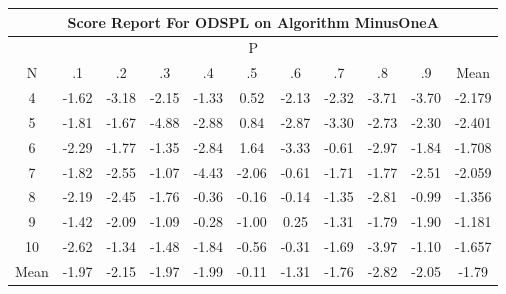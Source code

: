 \documentclass[11pt,a4paper]{report}
\begin{document}
\begin{longtable}{ | c || c | c | c | c | c | c | c | c | c || c |}
\hline
\multicolumn{11}{|c|}{ Score Report For ODSPL on Algorithm MinusOneA} \\
\hline
\multicolumn{11}{|c|}{ P } \\
\hline
N & .1 & .2 & .3 & .4 & .5 & .6 & .7 & .8 & .9 & Mean\\
 \hline
 \hline
 \endhead
  4 &  \cellcolor[HTML]{FFD7D7} -1.62 &  \cellcolor[HTML]{FFAFAF} -3.18 &  \cellcolor[HTML]{FFC7C7} -2.15 &  \cellcolor[HTML]{FFDFDF} -1.33 &  \cellcolor[HTML]{EFEFFF} 0.52 &  \cellcolor[HTML]{FFC7C7} -2.13 &  \cellcolor[HTML]{FFC7C7} -2.32 &  \cellcolor[HTML]{FF9F9F} -3.71 &  \cellcolor[HTML]{FF9F9F} -3.70 & -2.179 \\
  5 &  \cellcolor[HTML]{FFCFCF} -1.81 &  \cellcolor[HTML]{FFD7D7} -1.67 &  \cellcolor[HTML]{FF8787} -4.88 &  \cellcolor[HTML]{FFB7B7} -2.88 &  \cellcolor[HTML]{E7E7FF} 0.84 &  \cellcolor[HTML]{FFB7B7} -2.87 &  \cellcolor[HTML]{FFAFAF} -3.30 &  \cellcolor[HTML]{FFB7B7} -2.73 &  \cellcolor[HTML]{FFC7C7} -2.30 & -2.401 \\
  6 &  \cellcolor[HTML]{FFC7C7} -2.29 &  \cellcolor[HTML]{FFCFCF} -1.77 &  \cellcolor[HTML]{FFDFDF} -1.35 &  \cellcolor[HTML]{FFB7B7} -2.84 &  \cellcolor[HTML]{D7D7FF} 1.64 &  \cellcolor[HTML]{FFAFAF} -3.33 &  \cellcolor[HTML]{FFEFEF} -0.61 &  \cellcolor[HTML]{FFB7B7} -2.97 &  \cellcolor[HTML]{FFCFCF} -1.84 & -1.708 \\
  7 &  \cellcolor[HTML]{FFCFCF} -1.82 &  \cellcolor[HTML]{FFBFBF} -2.55 &  \cellcolor[HTML]{FFE7E7} -1.07 &  \cellcolor[HTML]{FF8F8F} -4.43 &  \cellcolor[HTML]{FFC7C7} -2.06 &  \cellcolor[HTML]{FFEFEF} -0.61 &  \cellcolor[HTML]{FFD7D7} -1.71 &  \cellcolor[HTML]{FFCFCF} -1.77 &  \cellcolor[HTML]{FFBFBF} -2.51 & -2.059 \\
  8 &  \cellcolor[HTML]{FFC7C7} -2.19 &  \cellcolor[HTML]{FFBFBF} -2.45 &  \cellcolor[HTML]{FFCFCF} -1.76 &  \cellcolor[HTML]{FFF7F7} -0.36 &  \cellcolor[HTML]{FFFFFF} -0.16 &  \cellcolor[HTML]{FFFFFF} -0.14 &  \cellcolor[HTML]{FFDFDF} -1.35 &  \cellcolor[HTML]{FFB7B7} -2.81 &  \cellcolor[HTML]{FFE7E7} -0.99 & -1.356 \\
  9 &  \cellcolor[HTML]{FFDFDF} -1.42 &  \cellcolor[HTML]{FFC7C7} -2.09 &  \cellcolor[HTML]{FFE7E7} -1.09 &  \cellcolor[HTML]{FFF7F7} -0.28 &  \cellcolor[HTML]{FFE7E7} -1.00 &  \cellcolor[HTML]{F7F7FF} 0.25 &  \cellcolor[HTML]{FFDFDF} -1.31 &  \cellcolor[HTML]{FFCFCF} -1.79 &  \cellcolor[HTML]{FFCFCF} -1.90 & -1.181 \\
  10 &  \cellcolor[HTML]{FFBFBF} -2.62 &  \cellcolor[HTML]{FFDFDF} -1.34 &  \cellcolor[HTML]{FFD7D7} -1.48 &  \cellcolor[HTML]{FFCFCF} -1.84 &  \cellcolor[HTML]{FFEFEF} -0.56 &  \cellcolor[HTML]{FFF7F7} -0.31 &  \cellcolor[HTML]{FFD7D7} -1.69 &  \cellcolor[HTML]{FF9797} -3.97 &  \cellcolor[HTML]{FFE7E7} -1.10 & -1.657 \\
 \hline
 \hline
Mean &  \cellcolor[HTML]{FFCFCF} -1.97 &  \cellcolor[HTML]{FFC7C7} -2.15 &  \cellcolor[HTML]{FFCFCF} -1.97 &  \cellcolor[HTML]{FFCFCF} -1.99 &  \cellcolor[HTML]{FFFFFF} -0.11 &  \cellcolor[HTML]{FFDFDF} -1.31 &  \cellcolor[HTML]{FFCFCF} -1.76 &  \cellcolor[HTML]{FFB7B7} -2.82 &  \cellcolor[HTML]{FFCFCF} -2.05 &  \cellcolor[HTML]{FFCFCF} -1.79
\end{longtable}
\end{document}
